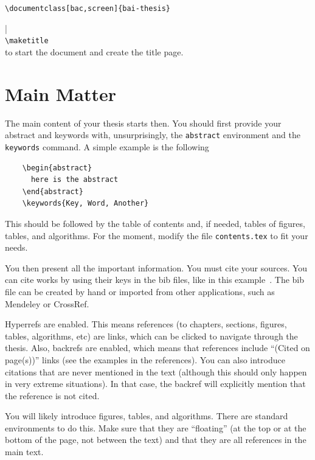 \verb|\documentclass[bac,screen]{bai-thesis}| \\
\begin{document}
| \\
\verb|\maketitle| \\[3mm]
to start the document and create the title page.

\section{Main Matter}

The main content of your thesis starts then. You should first
provide your abstract and keywords with, unsurprisingly, the 
\texttt{abstract} environment and the \texttt{keywords} command. 
A simple example is the following
\begin{verbatim}
    \begin{abstract}
      here is the abstract
    \end{abstract}
    \keywords{Key, Word, Another}
\end{verbatim}

This should be followed by the table of contents and, if needed,
tables of figures, tables, and algorithms. For the moment, modify
the file \texttt{contents.tex} to fit your needs.

You then present all the important information. You must cite your
sources. You can cite works by using their keys in the bib files, like in this example~\cite{latex2e,LiVR22,ChenZH23}.
%
The bib file can be created by hand or imported from other applications, such as Mendeley or CrossRef.

Hyperrefs are enabled.  This means references (to chapters, sections, figures, tables, algorithms, etc) are links, which can be clicked to navigate through the thesis.  Also, backrefs are enabled, which means that references include ``(Cited on page(s))'' links (see the examples in the references). You can also introduce citations that are never mentioned in
the text (although this should only happen in very extreme situations). In that case, the backref will explicitly mention that the reference is not cited.

\bigskip

You will likely introduce figures, tables, and algorithms. There are
standard environments to do this. Make sure that they are ``floating''
(at the top or at the bottom of the page, not between the text) and that
they are all references in the main text.
\end{document}
